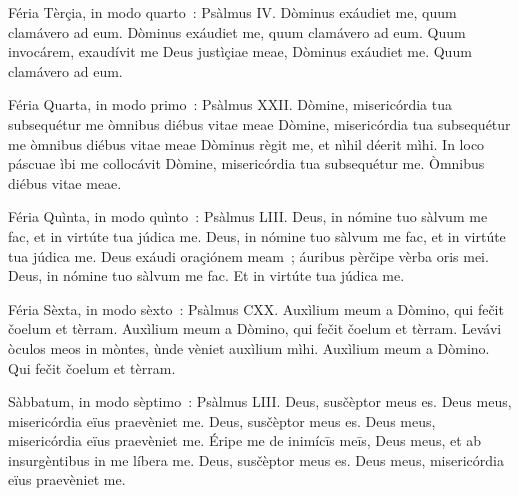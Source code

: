 \antiphonDayOfWeek
{Féria Tèrçia, in modo quarto~:}
{Psàlmus IV.}
{Dòminus exáudiet me, quum clamávero ad eum.}
{Dòminus exáudiet me, \symbolBreak quum clamávero ad eum.}
{Quum invocárem, exaudívit me Deus justìçiae meae,}
{Dòminus exáudiet me.}
{Quum clamávero ad eum.}
\vfill

\antiphonDayOfWeek
{Féria Quarta, in modo primo~:}
{Psàlmus XXII.}
{Dòmine, misericórdia tua subsequétur me òmnibus diébus vitae meae}
{Dòmine, misericórdia tua subsequétur me \symbolBreak òmnibus diébus vitae meae}
{Dòminus règit me, et nìhil déerit mìhi. In loco páscuae ìbi me collocávit}
{Dòmine, misericórdia tua subsequétur me.}
{Òmnibus diébus vitae meae.}

\newpage

\antiphonDayOfWeek
{Féria Quìnta, in modo quìnto~:}
{Psàlmus LIII.}
{Deus, in nómine tuo sàlvum me fac, et in virtúte tua júdica me.}
{Deus, in nómine tuo sàlvum me fac, \symbolBreak et in virtúte tua júdica me.}
{Deus exáudi oraçiónem meam~; áuribus pèrčipe vèrba oris mei.}
{Deus, in nómine tuo sàlvum me fac.}
{Et in virtúte tua júdica me.}

\antiphonDayOfWeek
{Féria Sèxta, in modo sèxto~:}
{Psàlmus CXX.}
{Auxìlium meum a Dòmino, qui fečit čoelum et tèrram.}
{Auxìlium meum a Dòmino, \symbolBreak qui fečit čoelum et tèrram.}
{Levávi òculos meos in mòntes, ùnde vèniet auxìlium mìhi.}
{Auxìlium meum a Dòmino.}
{Qui fečit čoelum et tèrram.}

\antiphonDayOfWeek
{Sàbbatum, in modo sèptimo~:}
{Psàlmus LIII.}
{Deus, susčèptor meus es. Deus meus, misericórdia eïus praevèniet me.}
{Deus, susčèptor meus es. \symbolBreak Deus meus, misericórdia eïus praevèniet me.}
{Éripe me de inimícīs meīs, Deus meus, et ab insurgèntibus in me líbera me.}
{Deus, susčèptor meus es.}
{Deus meus, misericórdia eïus praevèniet me.}

